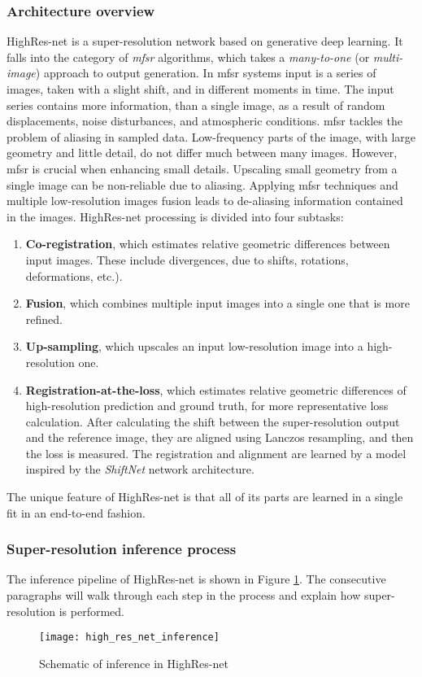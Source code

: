 \subsubsection{Architecture overview}
HighRes-net \cite{deudon-2020-highresnet} is a super-resolution network based on generative deep learning.
It falls into the category of \textit{\gls{mfsr}} algorithms, which takes a \textit{many-to-one} (or \textit{multi-image}) approach to output generation.
In \gls{mfsr} systems input is a series of images, taken with a slight shift, and in different moments in time.
The input series contains more information, than a single image, as a result of random displacements, noise disturbances, and atmospheric conditions.
\gls{mfsr} tackles the problem of aliasing in sampled data.
Low-frequency parts of the image, with large geometry and little detail, do not differ much between many images.
However, \gls{mfsr} is crucial when enhancing small details.
Upscaling small geometry from a single image can be non-reliable due to aliasing.
Applying \gls{mfsr} techniques and multiple low-resolution images fusion leads to de-aliasing information contained in the images.
HighRes-net processing is divided into four subtasks:
\begin{enumerate}
	\item \textbf{Co-registration}, which estimates relative geometric differences between input images. These include divergences, due to shifts, rotations, deformations, etc.).
	\item \textbf{Fusion}, which combines multiple input images into a single one that is more refined.
	\item \textbf{Up-sampling}, which upscales an input low-resolution image into a high-resolution one.
	\item \textbf{Registration-at-the-loss}, which estimates relative geometric differences of high-resolution prediction and ground truth, for more representative loss calculation. After calculating the shift between the super-resolution output and the reference image, they are aligned using Lanczos resampling, and then the loss is measured.
	    The registration and alignment are learned by a model inspired by the \textit{ShiftNet} network architecture.
\end{enumerate}
The unique feature of HighRes-net is that all of its parts are learned in a single fit in an end-to-end fashion.

\subsubsection{Super-resolution inference process}
The inference pipeline of HighRes-net is shown in Figure \ref{fig:highresnet-inference}.
The consecutive paragraphs will walk through each step in the process and explain how super-resolution is performed.
\begin{figure}
    \centering
    \texttt{[image: high\_res\_net\_inference]}
    \caption{Schematic of inference in HighRes-net \cite{deudon-2020-highresnet}}
    \label{fig:highresnet-inference}
\end{figure}


